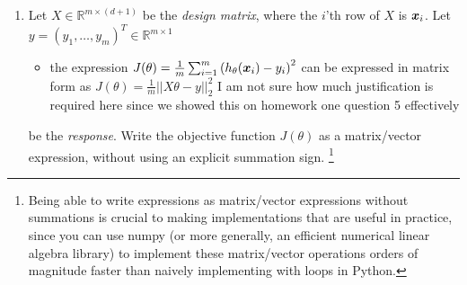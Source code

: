 \documentclass{article}
\begin{document}
\begin{enumerate}
  \setcounter{enumi}{\value{saveenum}}
\item Let $X\in\mathbb{R}^{m\times\left(d+1\right)}$ be the \emph{design matrix}, where the $i$'th row of $X$ is $\boldsymbol{x}_{i}$. Let $y=\left(y_{1},\ldots,y_{m}\right)^{T}\in\mathbb{R}^{m\times1}$
\begin{itemize}
    \item the expression $J(\theta)=\frac{1}{m}\sum_{i=1}^{m}\left(h_{\theta}(\boldsymbol{x}_{i})-y_{i}\right)^{2}$ can be expressed in matrix form as $J(\theta)=\frac{1}{m}||X\theta -y||_{2}^{2}$ I am not sure how much justification is required here since we showed this on homework one question 5 effectively
\end{itemize}
be the \emph{response}. Write the objective function $J(\theta)$ as
a matrix/vector expression, without using an explicit summation sign.
\footnote{Being able to write expressions as matrix/vector expressions without
summations is crucial to making implementations that are useful in
practice, since you can use numpy (or more generally, an efficient
numerical linear algebra library) to implement these matrix/vector
operations orders of magnitude faster than naively implementing with
loops in Python.} 




\end{enumerate}
\end{document}
